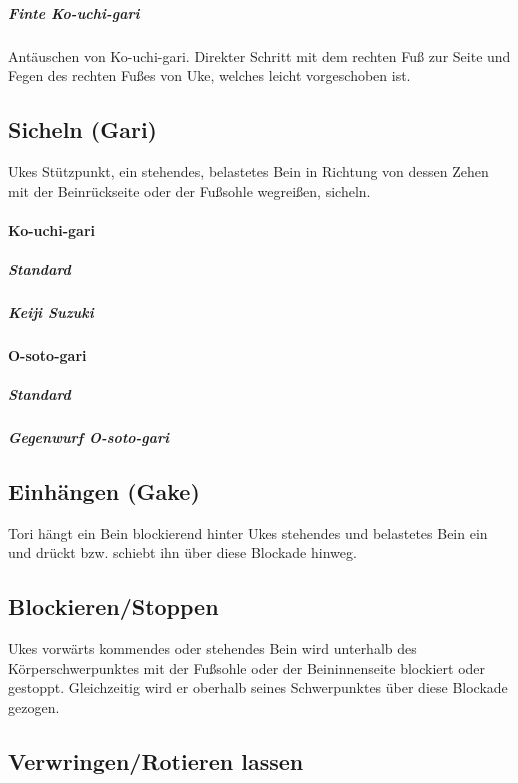 \documentclass[justified, a4paper, notitlepage, captions=tableheading, nobib]{tufte-handout}
\begin{document}
\subparagraph{Finte Ko-uchi-gari}
\label{sec:org624a49e}
Antäuschen von Ko-uchi-gari. Direkter Schritt mit dem rechten Fuß zur Seite und Fegen des rechten Fußes von Uke, welches leicht vorgeschoben ist.

\subsection{Sicheln (Gari)}
\label{sec:org9b98dcf}

Ukes Stützpunkt, ein stehendes, belastetes Bein in Richtung von dessen Zehen mit der Beinrückseite
oder der Fußsohle wegreißen, sicheln.

\paragraph{Ko-uchi-gari }
\label{sec:org0cadafe}

\subparagraph{Standard}
\label{sec:org02f70b5}

\subparagraph{Keiji Suzuki}
\label{sec:org2c36a9f}

\paragraph{O-soto-gari }
\label{sec:org930c3de}

\subparagraph{Standard}
\label{sec:org2dd75c9}

\subparagraph{Gegenwurf O-soto-gari}
\label{sec:org12b7fce}

\subsection{Einhängen (Gake)}
\label{sec:orgbfa053b}

Tori hängt ein Bein blockierend hinter Ukes stehendes und belastetes Bein ein und drückt bzw.
schiebt ihn über diese Blockade hinweg.

\subsection{Blockieren/Stoppen}
\label{sec:org74da32a}

Ukes vorwärts kommendes oder stehendes Bein wird unterhalb des Körperschwerpunktes mit der
Fußsohle oder der Beininnenseite blockiert oder gestoppt. Gleichzeitig wird er oberhalb seines
Schwerpunktes über diese Blockade gezogen.

\subsection{Verwringen/Rotieren lassen}
\label{sec:orgf560606}
\end{document}
